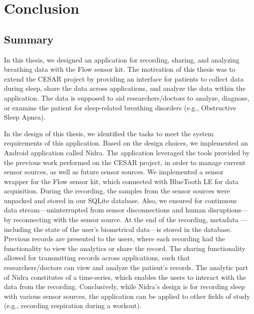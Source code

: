 \chapter{Conclusion}

\section{Summary}
In this thesis, we designed an application for recording, sharing, and analyzing breathing data with the Flow sensor kit. The motivation of this thesis was to extend the CESAR project by providing an interface for patients to collect data during sleep, share the data across applications, and analyze the data within the application. The data is supposed to aid researchers/doctors to analyze, diagnose, or examine the patient for sleep-related breathing disorders (e.g., Obstructive Sleep Apnea).  

In the design of this thesis, we identified the tasks to meet the system requirements of this application. Based on the design choices, we implemented an Android application called Nidra. The application leveraged the tools provided by the previous work performed on the CESAR project, in order to manage current sensor sources, as well as future sensor sources. We implemented a sensor wrapper for the Flow sensor kit, which connected with BlueTooth LE for data acquisition. During the recording, the samples from the sensor sources were unpacked and stored in our SQLite database. Also, we ensured for continuous data stream---uninterrupted from sensor disconnections and human disruptions---by reconnecting with the sensor source. At the end of the recording, metadata ---including the state of the user's biometrical data---is stored in the database. Previous records are presented to the users, where each recording had the functionality to view the analytics or share the record. The sharing functionality allowed for transmitting records across applications, such that researchers/doctors can view and analyze the patient's records. The analytic part of Nidra constitutes of a time-series, which enables the users to interact with the data from the recording.  Conclusively, while Nidra's design is for recording sleep with various sensor sources, the application can be applied to other fields of study (e.g., recording respiration during a workout).  

